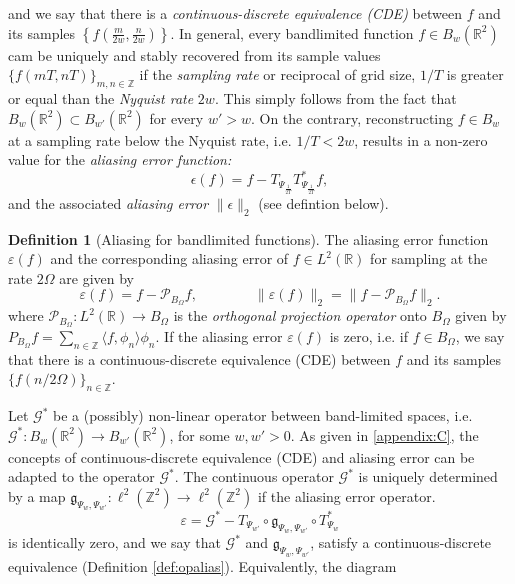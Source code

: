 \documentclass[reqno,10pt]{amsart}
\theoremstyle{plain}
\theoremstyle{definition}
\newtheorem{defn}{Definition}
\newcommand{\bb}[1]{\mathbb{#1}}
\newcommand{\cal}[1]{\mathcal{#1}}
\begin{document}
    and we say that there is a {\it continuous-discrete equivalence (CDE)} between $f$ and its samples $\left\{f\left(\frac{m}{2w},\frac{n}{2w}\right)\right\}$. In general, every bandlimited function $f \in B_w(\bb R^2)$ cam be uniquely and stably recovered from its sample values $\{f(mT,nT)\}_{m,n\in\bb Z}$ if the {\it sampling rate} or reciprocal of grid size, $1/T$ is greater or equal than the {\it Nyquist rate} $2w$. This simply follows from the fact that $B_w(\bb R^2) \subset B_{w'}(\bb R^2)$ for every $w' > w$. On the contrary, reconstructing $f \in B_w$ at a sampling rate below the Nyquist rate, i.e. $1/T < 2w$, results in a non-zero value for the {\it aliasing error function:}
    $$ \epsilon(f) = f - T_{{\Psi}_{\frac{1}{2T}}} T^*_{{\Psi}_{\frac{1}{2T}}}f,$$
    and the associated {\it aliasing error} $\|\epsilon\|_2$  (see defintion below).
    \begin{defn}[Aliasing for bandlimited functions]
        The aliasing error function $\varepsilon(f)$ and the corresponding aliasing error of $f \in L^2(\bb R)$ for sampling at the rate $2\Omega$ are given by
        $$ \varepsilon(f) = f - \cal P_{B_\Omega}f, \qquad\qquad \|\varepsilon(f)\|_2 = \|f - \cal P_{B_\Omega}f\|_2.$$
        where $\cal P_{B_\Omega} : L^2(\bb R) \to B_\Omega$ is the {\it orthogonal projection operator} onto $B_\Omega$ given by $P_{B_\Omega}f = \sum_{n\in \bb Z}\langle f,\phi_n\rangle\phi_n$. If the aliasing error $\varepsilon(f)$ is zero, i.e. if $f \in B_\Omega$, we say that there is a continuous-discrete equivalence (CDE) between $f$ and its samples $\{f(n/2\Omega)\}_{n \in \bb Z}$.
    \end{defn}
    \noindent Let $\cal G^*$ be a (possibly) non-linear operator between band-limited spaces, i.e. $\cal G^* :B_w(\bb R^2) \to B_{w'}(\bb R^2)$, for some $w,w' > 0$. As given in \ref{appendix:C}, the concepts of continuous-discrete equivalence (CDE) and aliasing error can be adapted to the operator $\cal G^*$. The continuous operator $\cal G^*$ is uniquely determined by a map $\mathfrak{g}_{\Psi_w, \Psi_{w'}}:\ell^2(\bb Z^2) \to \ell^2(\bb Z^2)$ if the aliasing error operator.
    \begin{equation}\label{eq:opaliaserror}
        \varepsilon = \cal G^* - T_{\Psi_{w'}} \circ \mathfrak{g}_{\Psi_w, \Psi_{w'}} \circ T^*_{\Psi_w}
    \end{equation}
    is identically zero, and we say that $\cal G^*$ and $\mathfrak{g}_{\Psi_w, \Psi_{w'}}$, satisfy a continuous-discrete equivalence (Definition \ref{def:opalias}). Equivalently, the diagram \\
    \begin{figure}[!ht]
        \centering
        \caption{}
    \end{figure}
\end{document}
